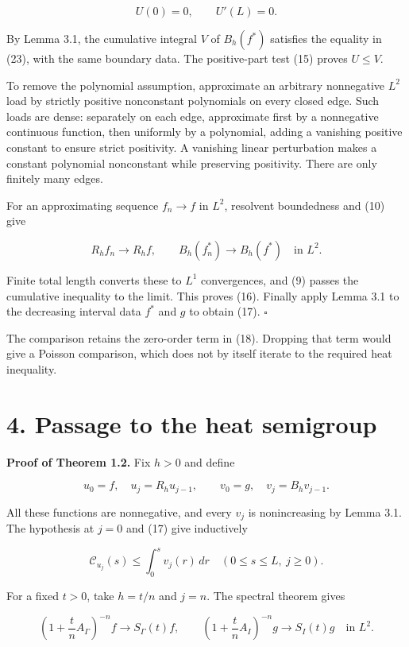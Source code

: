 \documentclass[11pt]{article}
\begin{document}
\[
U(0)=0,\qquad U'(L)=0.
\tag{24}
\]

By Lemma 3.1, the cumulative integral \(V\) of \(B_h(f^*)\) satisfies
the equality in (23), with the same boundary data. The positive-part
test (15) proves \(U\le V\).

To remove the polynomial assumption, approximate an arbitrary
nonnegative \(L^2\) load by strictly positive nonconstant polynomials on
every closed edge. Such loads are dense: separately on each edge,
approximate first by a nonnegative continuous function, then uniformly
by a polynomial, adding a vanishing positive constant to ensure strict
positivity. A vanishing linear perturbation makes a constant polynomial
nonconstant while preserving positivity. There are only finitely many
edges.

For an approximating sequence \(f_n\to f\) in \(L^2\), resolvent
boundedness and (10) give

\[
R_hf_n\to R_hf,\qquad
B_h(f_n^*)\to B_h(f^*)
\quad\text{in }L^2.
\tag{25}
\]

Finite total length converts these to \(L^1\) convergences, and (9)
passes the cumulative inequality to the limit. This proves (16). Finally
apply Lemma 3.1 to the decreasing interval data \(f^*\) and \(g\) to
obtain (17). \(\square\)

The comparison retains the zero-order term in (18). Dropping that term
would give a Poisson comparison, which does not by itself iterate to the
required heat inequality.

\section{4. Passage to the heat
semigroup}\label{passage-to-the-heat-semigroup}

\textbf{Proof of Theorem 1.2.} Fix \(h>0\) and define

\[
u_0=f,\quad u_j=R_hu_{j-1},\qquad
v_0=g,\quad v_j=B_hv_{j-1}.
\tag{26}
\]

All these functions are nonnegative, and every \(v_j\) is nonincreasing
by Lemma 3.1. The hypothesis at \(j=0\) and (17) give inductively

\[
\mathcal C_{u_j}(s)\le\int_0^s v_j(r)\,dr
\quad(0\le s\le L,\ j\ge0).
\tag{27}
\]

For a fixed \(t>0\), take \(h=t/n\) and \(j=n\). The spectral theorem
gives

\[
\left(1+\frac tn A_\Gamma\right)^{-n}f\longrightarrow S_\Gamma(t)f,
\qquad
\left(1+\frac tn A_I\right)^{-n}g\longrightarrow S_I(t)g
\quad\text{in }L^2.
\tag{28}
\]
\end{document}
